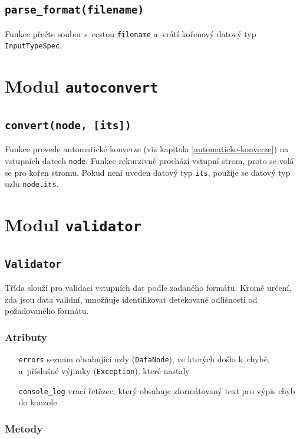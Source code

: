 \documentclass[FM,MP]{tulthesis}
\begin{document}
		\subsection*{\texttt{parse\_format(filename)}}
			Funkce přečte soubor s~cestou \texttt{filename} a~vrátí kořenový datový typ \texttt{InputTypeSpec}.

	\section{Modul \texttt{autoconvert}}
		\subsection*{\texttt{convert(node, [its])}}
			Funkce provede automatické konverze (viz kapitola \ref{automaticke-konverze}) na vstupních datech \texttt{node}. Funkce rekurzivně prochází vstupní strom, proto se volá se pro kořen stromu. Pokud není uveden datový typ \texttt{its}, použije se datový typ uzlu \texttt{node.its}.


	\section{Modul \texttt{validator}}
		\subsection*{\texttt{Validator}}
			Třída slouží pro validaci vstupních dat podle zadaného formátu. Kromě určení, zda jsou data validní, umožňuje identifikovat detekované odlišnosti od požadovaného formátu.

			\subsubsection{Atributy}
				\begin{itemize}[leftmargin=3cm]
					\setlength\itemsep{-2mm}
					\item[\texttt{errors}] seznam obsahující uzly (\texttt{DataNode}), ve kterých došlo k~chybě, a~pří\-slušné výjimky (\texttt{Exception}), které nastaly
					\item[\texttt{console\_log}] vrací řetězec, který obsahuje zformátovaný text pro výpis chyb do konzole
				\end{itemize}
			
			\subsubsection{Metody}
\end{document}
